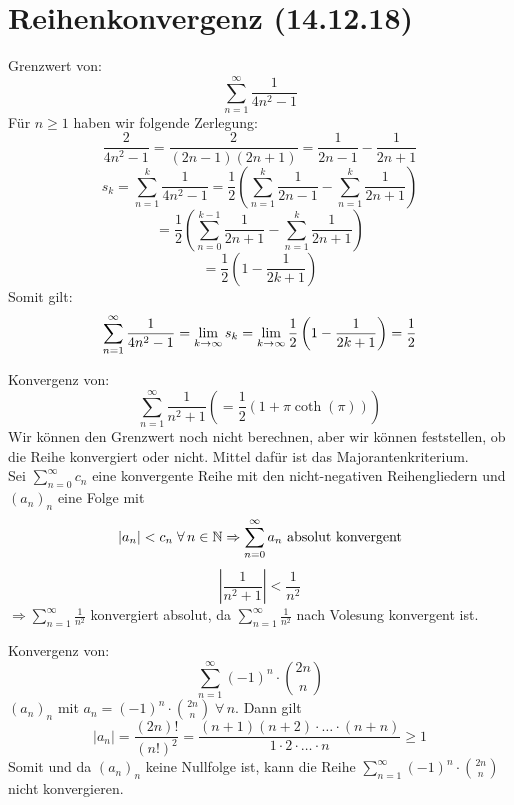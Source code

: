 \documentclass[../ana1u.tex]{subfiles}
\begin{document}
\setcounter{section}{7}

\section{Reihenkonvergenz (14.12.18)}
\begin{bsp}
    Grenzwert von:
    \[\sum_{n=1}^{\infty} \frac{1}{4n^2 - 1}\]
    Für \(n \geq 1\) haben wir folgende Zerlegung:
    \[\frac{2}{4n^2 - 1} = \frac{2}{(2n - 1)(2n + 1)} = \frac{1}{2n-1} - \frac{1}{2n+1}\]
    \[s_k = \sum_{n=1}^{k} \frac{1}{4n^2-1} = \frac{1}{2}\left(\sum_{n=1}^{k} \frac{1}{2n-1} 
    - \sum_{n=1}^{k} \frac{1}{2n+1} \right) \]
    \[= \frac{1}{2}\left(\sum_{n=0}^{k-1} \frac{1}{2n+1} 
    - \sum_{n=1}^{k} \frac{1}{2n+1} \right) \]
    \[= \frac{1}{2}\left(1 - \frac{1}{2k+1}\right) \]
    Somit gilt:
    \[\sum_{n=1}^{\infty} \frac{1}{4n^2 - 1} = \lim\limits_{k\rightarrow\infty} s_k 
    = \lim\limits_{k\rightarrow\infty} \frac{1}{2}\left(1 - \frac{1}{2k+1}\right) = \frac{1}{2} \]
\end{bsp}
\begin{bsp}
    Konvergenz von:
    \[\sum_{n=1}^{\infty} \frac{1}{n^2+1} \left(= \frac{1}{2}(1 + \pi \coth(\pi)) \right) \]
    Wir können den Grenzwert noch nicht berechnen, aber wir können feststellen, ob die 
    Reihe konvergiert oder nicht. Mittel dafür ist das Majorantenkriterium. \\
    Sei \(\sum_{n=0}^{\infty}c_n \) eine konvergente Reihe mit den nicht-negativen 
    Reihengliedern und \((a_n)_n \) eine Folge mit
    \[|a_n| < c_n \; \forall \, n \in \mathbb{N} \Rightarrow \sum_{n=0}^{\infty} a_n 
    \text{ absolut konvergent} \]
    \[\left|\frac{1}{n^2+1}\right| < \frac{1}{n^2} \]
    \(\Rightarrow \sum_{n=1}^{\infty} \frac{1}{n^2} \) konvergiert absolut, da 
    \(\sum_{n=1}^{\infty} \frac{1}{n^2} \) nach Volesung konvergent ist.
\end{bsp}
\begin{bsp}
    Konvergenz von:\[\sum_{n=1}^{\infty} (-1)^n \cdot \binom{2n}{n} \]
    \((a_n)_n\) mit \(a_n = (-1)^n \cdot \binom{2n}{n} \; \forall \, n \). Dann gilt
    \[|a_n| = \frac{(2n)!}{(n!)^2} = \frac{(n+1)(n+2) \cdot \hdots \cdot (n+n)}{1 \cdot 2 
    \cdot \hdots \cdot n} \geq 1 \]
    Somit und da \((a_n)_n\) keine Nullfolge ist, kann die Reihe 
    \(\sum_{n=1}^{\infty} (-1)^n \cdot \binom{2n}{n}\) nicht konvergieren.
\end{bsp}
\end{document}
